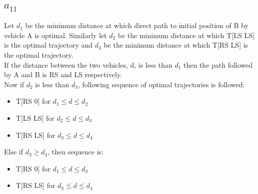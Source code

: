 \documentclass[11pt]{article} %
\begin{document}
\subsection{$a_{11}$}
Let $d_1$ be the minimum distance at which direct path to initial position of B by vehicle A is optimal. Similarly let $d_2$ be the minimum distance at which T[LS LS] is the optimal trajectory and  $d_3$ be the minimum distance at which T[RS LS] is the optimal trajectory. \\
If the distance between the two vehicles, d, is less than $d_1$ then the path followed by A and B is RS and LS respectively.\\
Now if $d_2$ is less than $d_3$, following sequence of optimal trajectories is followed:
\begin{itemize}
\item T[RS 0] for $d_1 \leq d \leq d_2$
\item T[LS LS] for $d_2 \leq d \leq d_3$
\item T[RS LS]  for $d_3 \leq d \leq d_4$
\end{itemize}
Else if $d_3 \geq d_4$, then sequence is:
\begin{itemize}
\item T[RS 0] for $d_1 \leq d \leq d_3$
\item T[RS LS]  for $d_3 \leq d \leq d_4$
\end{itemize}
\end{document}
